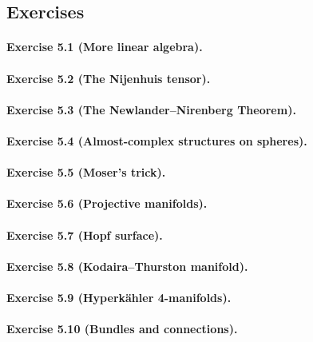 \documentclass[a4paper]{article}
\theoremstyle{definition}
\theoremstyle{remark}
\begin{document}
\subsection*{Exercises}

\paragraph{Exercise 5.1 {\normalfont(More linear algebra)}.}

\paragraph{Exercise 5.2 {\normalfont(The Nijenhuis tensor)}.} 

\paragraph{Exercise 5.3 {\normalfont(The Newlander--Nirenberg Theorem)}.} 

\paragraph{Exercise 5.4 {\normalfont(Almost-complex structures on spheres)}.} 

\paragraph{Exercise 5.5 {\normalfont(Moser's trick)}.} 

\paragraph{Exercise 5.6 {\normalfont(Projective manifolds)}.} 

\paragraph{Exercise 5.7 {\normalfont(Hopf surface)}.} 

\paragraph{Exercise 5.8 {\normalfont(Kodaira--Thurston manifold)}.} 

\paragraph{Exercise 5.9 {\normalfont(Hyperk\"ahler 4-manifolds)}.} 

\paragraph{Exercise 5.10 {\normalfont(Bundles and connections)}.} 
\end{document}
